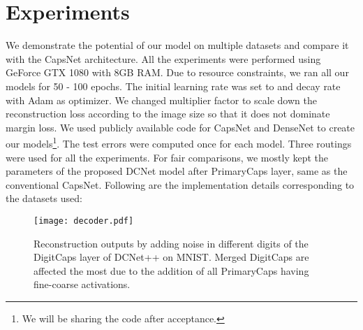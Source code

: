 \documentclass{bmvc2k}
\begin{document}
\section{Experiments}
We demonstrate the potential of our model on multiple datasets and compare it with the CapsNet architecture. All the experiments were performed using GeForce GTX 1080 with 8GB RAM. Due to resource constraints, we ran all our models for 50 - 100 epochs. The initial learning rate was set to  and decay rate  with Adam as optimizer. We changed multiplier factor to scale down the reconstruction loss according to the image size so that it does not dominate margin loss. We used publicly available code \cite{densecode,capscode} for CapsNet and DenseNet to create our models\footnote{We will be sharing the code after acceptance.}. The test errors were computed once for each model. Three routings were used for all the experiments. For fair comparisons, we mostly kept the parameters of the proposed DCNet model after PrimaryCaps layer, same as the conventional CapsNet. Following are the implementation details corresponding to the datasets used:

\begin{figure*}[!htbp]
\begin{center}
\texttt{[image: decoder.pdf]}
\end{center}
\vspace{-6px}
   \caption{Reconstruction outputs by adding noise in different digits of the DigitCaps layer of DCNet++ on MNIST. Merged DigitCaps are affected the most due to the addition of all PrimaryCaps having fine-coarse activations.}
\label{fig:reconstructions}
\end{figure*}
\end{document}
